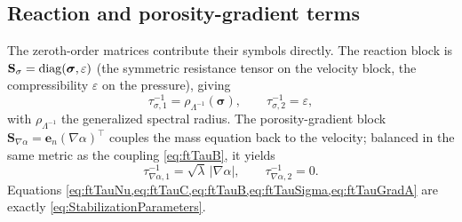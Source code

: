 \subsection{Reaction and porosity-gradient terms}\label{sec:ftZeroth}
The zeroth-order matrices contribute their symbols directly. The reaction block is $\mathbf{S}_\sigma=\operatorname{diag}(\boldsymbol{\sigma},\varepsilon)$ (the symmetric resistance tensor on the velocity block, the compressibility $\varepsilon$ on the pressure), giving
\begin{equation}\label{eq:ftTauSigma}
  \tau_{\sigma,1}^{-1} = \rho_{\Lambda^{-1}}(\boldsymbol{\sigma}),\qquad \tau_{\sigma,2}^{-1} = \varepsilon,
\end{equation}
with $\rho_{\Lambda^{-1}}$ the generalized spectral radius. The porosity-gradient block $\mathbf{S}_{\nabla\alpha}=\boldsymbol{e}_{n}(\nabla\alpha)^{\top}$ couples the mass equation back to the velocity; balanced in the same metric as the coupling \cref{eq:ftTauB}, it yields
\begin{equation}\label{eq:ftTauGradA}
  \tau_{\nabla\alpha,1}^{-1} = \sqrt{\lambda}\,|\nabla\alpha|,\qquad \tau_{\nabla\alpha,2}^{-1}=0.
\end{equation}
Equations \cref{eq:ftTauNu,eq:ftTauC,eq:ftTauB,eq:ftTauSigma,eq:ftTauGradA} are exactly \cref{eq:StabilizationParameters}.

